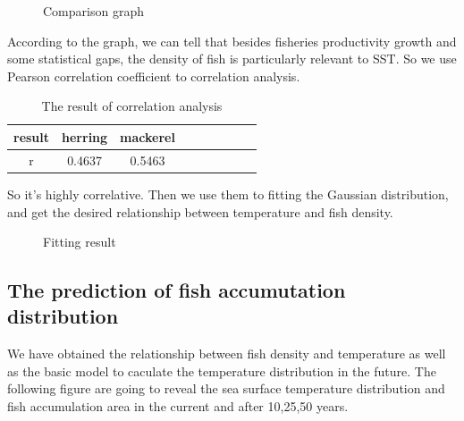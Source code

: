 \documentclass{mcmthesis}
\begin{document}
 \begin{figure}[htbp]
\caption{Comparison graph}\label{figure1}
 \end{figure}

  According to the graph, we can tell that besides fisheries productivity growth and some statistical gaps, the density of fish is particularly relevant to SST. So we use Pearson correlation coefficient to correlation analysis. 

  \begin{table}[h]
    \centering
    \setlength{\abovecaptionskip}{0pt}%
    \setlength{\belowcaptionskip}{15pt}%
    \caption{The result of correlation analysis}
    \begin{tabular}{ccccccccc}
    \toprule[1.5pt]
    result &herring &mackerel\\
    \toprule[1.5pt]
    r&0.4637&0.5463\\
    \bottomrule[1.5pt]
    \end{tabular}
  \end{table}

  So it's highly correlative. Then we use them to fitting the Gaussian distribution, and get the desired relationship between temperature and fish density.

 \begin{figure}[htbp]
   \caption{Fitting result}\label{figure1}
 \end{figure}

\subsection{The prediction of fish accumutation distribution}
  We have obtained the relationship between fish density and temperature as well as the basic model to caculate the temperature distribution in the future. The following figure are going to reveal the sea surface temperature distribution and fish accumulation area in the current and after 10,25,50 years. 
\end{document}
